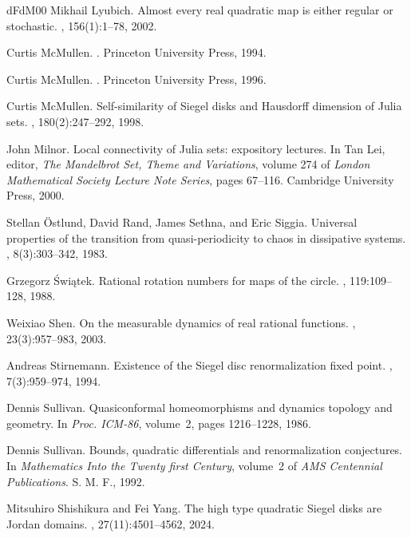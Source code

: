\documentclass{amsart}
\begin{document}
\begin{thebibliography}{dFdM00}
Mikhail Lyubich.
\newblock Almost every real quadratic map is either regular or stochastic.
, 156(1):1--78, 2002.

Curtis McMullen.
.
\newblock Princeton University Press, 1994.

Curtis McMullen.
.
\newblock Princeton University Press, 1996.

Curtis McMullen.
\newblock Self-similarity of {Siegel} disks and {Hausdorff} dimension of {Julia} sets.
, 180(2):247--292, 1998.

John Milnor.
\newblock Local connectivity of {Julia} sets: expository lectures.
\newblock In Tan Lei, editor, {\em The Mandelbrot Set, Theme and Variations}, volume 274 of {\em London Mathematical Society Lecture Note Series}, pages 67--116. Cambridge University Press, 2000.

Stellan {\"O}stlund, David Rand, James Sethna, and Eric Siggia.
\newblock Universal properties of the transition from quasi-periodicity to chaos in dissipative systems.
, 8(3):303--342, 1983.

Grzegorz \'Swi\k{a}tek.
\newblock Rational rotation numbers for maps of the circle.
, 119:109--128, 1988.

Weixiao Shen.
\newblock On the measurable dynamics of real rational functions.
, 23(3):957--983, 2003.

Andreas Stirnemann.
\newblock Existence of the {Siegel} disc renormalization fixed point.
, 7(3):959--974, 1994.

Dennis Sullivan.
\newblock Quasiconformal homeomorphisms and dynamics topology and geometry.
\newblock In {\em Proc. ICM-86}, volume~2, pages 1216--1228, 1986.

Dennis Sullivan.
\newblock Bounds, quadratic differentials and renormalization conjectures.
\newblock In {\em Mathematics Into the Twenty first Century}, volume~2 of {\em AMS Centennial Publications}. S. M. F., 1992.

Mitsuhiro Shishikura and Fei Yang.
\newblock The high type quadratic {Siegel} disks are {Jordan} domains.
, 27(11):4501--4562, 2024.


\end{thebibliography}
\end{document}
